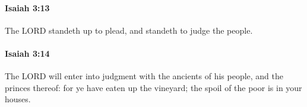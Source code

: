		\paragraph{Isaiah 3:13} %
			\label{ISAIAH-3-13}

			The LORD standeth up to plead, and standeth to judge the people.


		\paragraph{Isaiah 3:14} %
			\label{ISAIAH-3-14}

			The LORD will enter into judgment with the ancients of his people, and the princes thereof: for ye have eaten up the vineyard; the spoil of the poor is in your houses.



